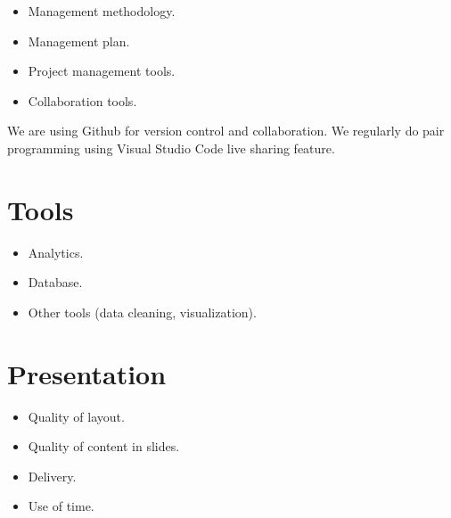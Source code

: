 \documentclass[a4paper,12pt]{report}
\begin{document}
\begin{itemize}
    \item Management methodology.
	\item Management plan.
	\item Project management tools.
	\item Collaboration tools.
\end{itemize}


	We are using Github for version control and collaboration. We regularly do pair programming using Visual Studio Code live sharing feature. 


\chapter{Tools}

\begin{itemize}
    \item Analytics.
	\item Database.
	\item Other tools (data cleaning, visualization).
\end{itemize}



\chapter{Presentation}

\begin{itemize}
    \item Quality of layout.
	\item Quality of content in slides.
	\item Delivery.
	\item Use of time. 
\end{itemize}
\end{document}
